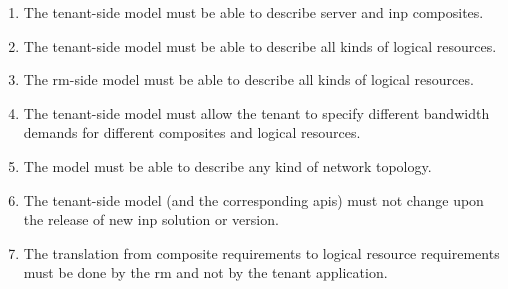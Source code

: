 \begin{enumerate}[
    label=\textbf{FR\arabic*},
    leftmargin=*,
    labelindent=1em
]
    \item \label{model:requirements:tenant-side_model_composite_expressiveness}
    The tenant-side model must be able to describe server and \gls{inp} composites.
    
    \item \label{model:requirements:tenant-side_model_logical_resources_expressiveness}
    The tenant-side model must be able to describe all kinds of logical resources.
    
    \item \label{model:requirements:rm-side_model_expressiveness}
    The \gls{rm}-side model must be able to describe all kinds of logical resources.

    \item \label{model:requirements:bandwidth}
    The tenant-side model must allow the tenant to specify different bandwidth demands for different composites and logical resources.
    
    \item \label{model:requirements:topology}
    The model must be able to describe any kind of network topology.

    \item \label{model:requirements:invariance}
    The tenant-side model (and the corresponding \glspl{api}) must not change upon the release of new \gls{inp} solution or version.
    
    \item \label{model:requirements:translation}
    The translation from composite requirements to logical resource requirements must be done by the \gls{rm} and not by the tenant application.
\end{enumerate}